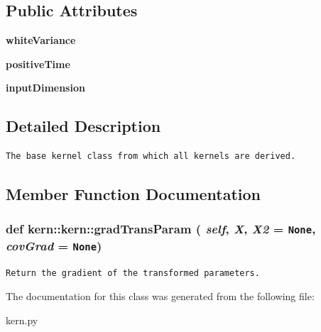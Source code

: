 \subsection*{Public Attributes}
\begin{CompactItemize}
\item 
\hypertarget{classkern_1_1kern_ca8c12bf8b6d8e82bcdf788a5070ba87}{
\textbf{whiteVariance}}
\label{classkern_1_1kern_ca8c12bf8b6d8e82bcdf788a5070ba87}

\item 
\hypertarget{classkern_1_1kern_40490a9567826e3f96e9f8be3d798ac9}{
\textbf{positiveTime}}
\label{classkern_1_1kern_40490a9567826e3f96e9f8be3d798ac9}

\item 
\hypertarget{classkern_1_1kern_dca0b0f3105db47c0627a0bbc5868001}{
\textbf{inputDimension}}
\label{classkern_1_1kern_dca0b0f3105db47c0627a0bbc5868001}

\end{CompactItemize}


\subsection{Detailed Description}


\footnotesize\begin{verbatim}The base kernel class from which all kernels are derived.\end{verbatim}
\normalsize
 

\subsection{Member Function Documentation}
\hypertarget{classkern_1_1kern_9cd784d93e47e96eeceda8eecf1be2db}{
\subsubsection[{gradTransParam}]{\setlength{\rightskip}{0pt plus 5cm}def kern::kern::gradTransParam ( {\em self}, \/   {\em X}, \/   {\em X2} = {\tt None}, \/   {\em covGrad} = {\tt None})}}
\label{classkern_1_1kern_9cd784d93e47e96eeceda8eecf1be2db}




\footnotesize\begin{verbatim}Return the gradient of the transformed parameters.\end{verbatim}
\normalsize
 

The documentation for this class was generated from the following file:\begin{CompactItemize}
\item 
kern.py\end{CompactItemize}
